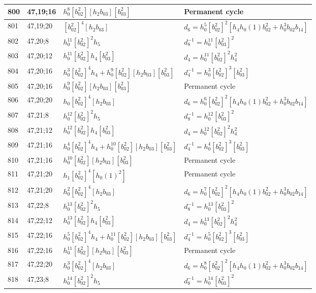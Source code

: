 \documentclass{article}
\begin{document}
\begin{longtable}{|l|l|>{\raggedright\arraybackslash}p{6cm}|>{\raggedright\arraybackslash}p{6cm}|}
800 & 47,19;16 & $h_0^8[b_{02}^2][h_2b_{03}][b_{03}^2]$ & Permanent cycle\\
\hline
801 & 47,19;20 & $[b_{02}^2]^4[h_2b_{03}]$ &$d_{6}=h_0^5[b_{02}^2]^2[h_4h_0(1)b_{02}^2 + h_0^3b_{02}b_{14}]$\\
\hline
802 & 47,20;8 & $h_0^{11}[b_{02}^2]^2h_5$ & $d_{8}^{-1}=h_0^{11}[b_{03}^2]^2$\\
\hline
803 & 47,20;12 & $h_0^{11}[b_{02}^2]h_4[b_{03}^2]$ &$d_{4}=h_0^{11}[b_{02}^2]^2h_4^2$\\
\hline
804 & 47,20;16 & $h_0^3[b_{02}^2]^4h_4 + h_0^9[b_{02}^2][h_2b_{03}][b_{03}^2]$ & $d_{4}^{-1}=h_0^3[b_{02}^2]^3[b_{03}^2]$\\
805 & 47,20;16 & $h_0^9[b_{02}^2][h_2b_{03}][b_{03}^2]$ & Permanent cycle\\
\hline
806 & 47,20;20 & $h_0[b_{02}^2]^4[h_2b_{03}]$ &$d_{6}=h_0^6[b_{02}^2]^2[h_4h_0(1)b_{02}^2 + h_0^3b_{02}b_{14}]$\\
\hline
807 & 47,21;8 & $h_0^{12}[b_{02}^2]^2h_5$ & $d_{8}^{-1}=h_0^{12}[b_{03}^2]^2$\\
\hline
808 & 47,21;12 & $h_0^{12}[b_{02}^2]h_4[b_{03}^2]$ &$d_{4}=h_0^{12}[b_{02}^2]^2h_4^2$\\
\hline
809 & 47,21;16 & $h_0^4[b_{02}^2]^4h_4 + h_0^{10}[b_{02}^2][h_2b_{03}][b_{03}^2]$ & $d_{4}^{-1}=h_0^4[b_{02}^2]^3[b_{03}^2]$\\
810 & 47,21;16 & $h_0^{10}[b_{02}^2][h_2b_{03}][b_{03}^2]$ & Permanent cycle\\
\hline
811 & 47,21;20 & $h_1[b_{02}^2]^4[h_0(1)^2]$ & Permanent cycle\\
812 & 47,21;20 & $h_0^2[b_{02}^2]^4[h_2b_{03}]$ &$d_{6}=h_0^7[b_{02}^2]^2[h_4h_0(1)b_{02}^2 + h_0^3b_{02}b_{14}]$\\
\hline
813 & 47,22;8 & $h_0^{13}[b_{02}^2]^2h_5$ & $d_{8}^{-1}=h_0^{13}[b_{03}^2]^2$\\
\hline
814 & 47,22;12 & $h_0^{13}[b_{02}^2]h_4[b_{03}^2]$ &$d_{4}=h_0^{13}[b_{02}^2]^2h_4^2$\\
\hline
815 & 47,22;16 & $h_0^5[b_{02}^2]^4h_4 + h_0^{11}[b_{02}^2][h_2b_{03}][b_{03}^2]$ & $d_{4}^{-1}=h_0^5[b_{02}^2]^3[b_{03}^2]$\\
816 & 47,22;16 & $h_0^{11}[b_{02}^2][h_2b_{03}][b_{03}^2]$ & Permanent cycle\\
\hline
817 & 47,22;20 & $h_0^3[b_{02}^2]^4[h_2b_{03}]$ &$d_{6}=h_0^8[b_{02}^2]^2[h_4h_0(1)b_{02}^2 + h_0^3b_{02}b_{14}]$\\
\hline
818 & 47,23;8 & $h_0^{14}[b_{02}^2]^2h_5$ & $d_{8}^{-1}=h_0^{14}[b_{03}^2]^2$\\

\end{longtable}
\end{document}
